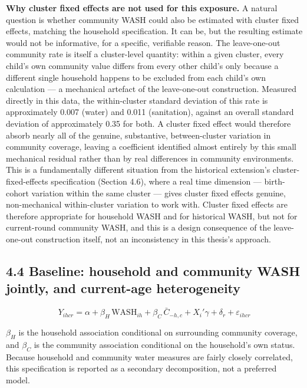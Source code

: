 \textbf{Why cluster fixed effects are not used for this exposure.} A natural question is whether community WASH could also be estimated with cluster fixed effects, matching the household specification. It can be, but the resulting estimate would not be informative, for a specific, verifiable reason. The leave-one-out community rate is itself a cluster-level quantity: within a given cluster, every child's own community value differs from every other child's only because a different single household happens to be excluded from each child's own calculation --- a mechanical artefact of the leave-one-out construction. Measured directly in this data, the within-cluster standard deviation of this rate is approximately 0.007 (water) and 0.011 (sanitation), against an overall standard deviation of approximately 0.35 for both. A cluster fixed effect would therefore absorb nearly all of the genuine, substantive, between-cluster variation in community coverage, leaving a coefficient identified almost entirely by this small mechanical residual rather than by real differences in community environments. This is a fundamentally different situation from the historical extension's cluster-fixed-effects specification (Section 4.6), where a real time dimension --- birth-cohort variation within the same cluster --- gives cluster fixed effects genuine, non-mechanical within-cluster variation to work with. Cluster fixed effects are therefore appropriate for household WASH and for historical WASH, but not for current-round community WASH, and this is a design consequence of the leave-one-out construction itself, not an inconsistency in this thesis's approach.

\subsection*{4.4 Baseline: household and community WASH jointly, and current-age heterogeneity}

$$Y_{ihcr} = \alpha + \beta_H\,\text{WASH}_{ih} + \beta_C\,\bar{C}_{-h,c} + X_i'\gamma + \delta_r + \varepsilon_{ihcr}$$

$\beta_H$ is the household association conditional on surrounding community coverage, and $\beta_C$ is the community association conditional on the household's own status. Because household and community water measures are fairly closely correlated, this specification is reported as a secondary decomposition, not a preferred model.


